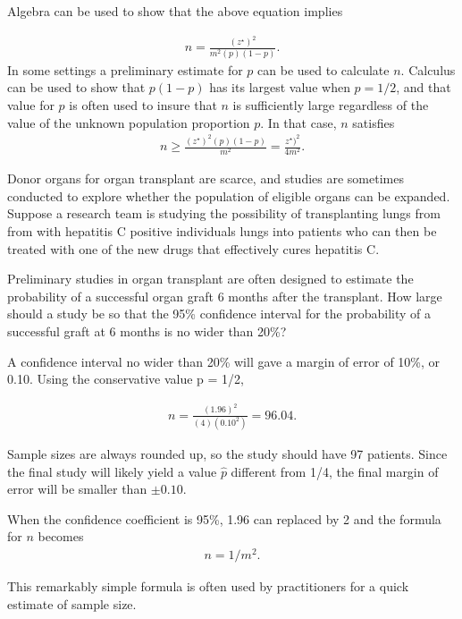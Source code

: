 Algebra can be used to show that the above equation implies

\begin{align*}
n = \frac{(z^{\star})^2}{m^2(p)(1 - p)}.
\end{align*}
In some settings a preliminary estimate for $p$ can be used to calculate $n$.  Calculus can be used to show that $p(1 - p)$ has its largest value when $p = 1/2$, and that value for $p$ is often used to insure that $n$ is sufficiently large regardless of the value of the unknown population proportion $p$.  In  that case, $n$ satisfies
\begin{align*}
  n \geq \frac{(z^{\star})^2(p)(1-p)}{m^2} = \frac{z^{\star})^2}{4m^2}.
\end{align*}

\begin{example}
 Donor organs for organ transplant are scarce, and studies are sometimes conducted to explore whether the population of eligible organs can be expanded. Suppose a research team is studying the possibility of transplanting lungs from from with hepatitis C positive individuals lungs into patients who can then be treated with one of the new drugs that effectively cures hepatitis C.

 Preliminary studies in organ transplant are often designed to estimate the probability of a successful organ graft 6 months after the transplant.  How large should a study be so that the 95\% confidence interval for the probability of a successful graft at 6 months is no wider than 20\%?

 A confidence interval no wider than 20\% will gave a margin of error of 10\%, or 0.10.  Using the conservative value p = 1/2,

 \begin{align*}
    n = \frac{(1.96)^2}{(4)(0.10^2)} =  96.04.
\end{align*}

Sample sizes are always rounded up, so the study should have 97 patients.  Since the final study will likely yield a value $\hat{p}$ different from 1/4, the final margin of error will be smaller than $\pm 0.10$.
\end{example}

When the confidence coefficient is 95\%, 1.96 can replaced by 2 and the formula for $n$ becomes
\begin{align*}
  n = 1/m^2.
\end{align*}

This remarkably simple formula is often used by practitioners for a quick estimate of sample size.

